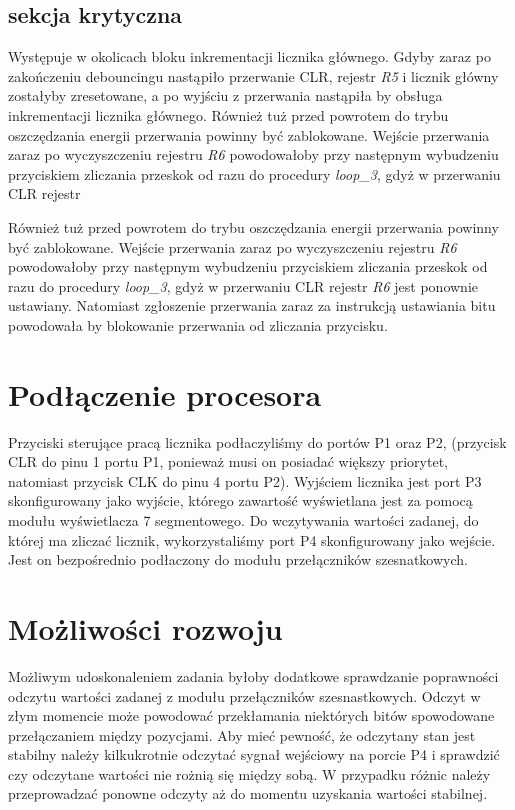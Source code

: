 \documentclass[fleqn]{article}
\begin{document}


\pagebreak



\pagebreak
\subsection{sekcja krytyczna}
		Występuje w okolicach bloku inkrementacji licznika głównego. Gdyby zaraz po zakończeniu debouncingu nastąpiło przerwanie CLR, rejestr \textit{R5} i licznik główny zostałyby zresetowane, a po wyjściu z przerwania nastąpiła by obsługa inkrementacji licznika głównego.
		Również tuż przed powrotem do trybu oszczędzania energii przerwania powinny być zablokowane. Wejście przerwania zaraz po wyczyszczeniu rejestru \textit{R6} powodowałoby przy następnym wybudzeniu przyciskiem zliczania przeskok od razu do procedury \textit{loop\_3}, gdyż w przerwaniu CLR rejestr

		Również tuż przed powrotem do trybu oszczędzania energii przerwania powinny być zablokowane. Wejście przerwania zaraz po wyczyszczeniu rejestru \textit{R6} powodowałoby przy następnym wybudzeniu przyciskiem zliczania przeskok od razu do procedury \textit{loop\_3}, gdyż w przerwaniu CLR rejestr \textit{R6} jest ponownie ustawiany. Natomiast zgłoszenie przerwania zaraz za instrukcją ustawiania bitu powodowała by blokowanie przerwania od zliczania przycisku.



\section{Podłączenie procesora}


Przyciski sterujące pracą licznika podłaczyliśmy do portów P1 oraz P2, (przycisk CLR do pinu 1 portu P1, ponieważ musi on posiadać większy priorytet, natomiast przycisk CLK do pinu 4 portu P2). Wyjściem licznika jest port P3 skonfigurowany jako wyjście, którego zawartość wyświetlana jest za pomocą modułu wyświetlacza 7 segmentowego. Do wczytywania wartości zadanej, do której ma zliczać licznik, wykorzystaliśmy port P4 skonfigurowany jako wejście. Jest on bezpośrednio podłaczony do modułu przełączników szesnatkowych.

\section{Możliwości rozwoju}

Możliwym udoskonaleniem zadania byłoby dodatkowe sprawdzanie poprawności odczytu wartości zadanej z modułu przełączników szesnastkowych. Odczyt w złym momencie może powodować przekłamania niektórych bitów spowodowane przełączaniem między pozycjami. Aby mieć pewność, że odczytany stan jest stabilny należy kilkukrotnie odczytać sygnał wejściowy na porcie P4 i sprawdzić czy odczytane wartości nie rożnią się między sobą. W przypadku różnic należy przeprowadzać ponowne odczyty aż do momentu uzyskania wartości stabilnej.
\end{document}
